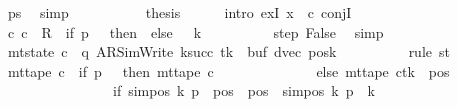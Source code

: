 \begin{isabellebody}
\ ps\ \isamarkupfalse%
\ simp\isanewline
\ \ \ \ \isamarkupfalse%
\isanewline
\ \ \ \ \isamarkupfalse%
\ {\isacharquery}{\kern0pt}thesis\isanewline
\ \ \ \ \isamarkupfalse%
\ {\isacharparenleft}{\kern0pt}intro\ exI{\isacharbrackleft}{\kern0pt}\ x\ {\isacharequal}{\kern0pt}\ c{\isacharprime}{\kern0pt}{\isacharprime}{\kern0pt}{\isacharbrackright}{\kern0pt}\ conjI{\isacharparenright}{\kern0pt}\isanewline
\ \ \ \ \ \ \isamarkupfalse%
\ {\isachardoublequoteopen}{\isacharparenleft}{\kern0pt}c{\isacharprime}{\kern0pt}{\isacharcomma}{\kern0pt}\ c{\isacharprime}{\kern0pt}{\isacharprime}{\kern0pt}{\isacharparenright}{\kern0pt}\ {\isasymin}\ {\isacharquery}{\kern0pt}R\ {\isacharcircum}{\kern0pt}{\isacharcircum}{\kern0pt}\ {\isacharparenleft}{\kern0pt}if\ p\ {\isacharequal}{\kern0pt}\ {}\ then\ {}\ else\ {}\ {\isacharasterisk}{\kern0pt}\ {\isacharquery}{\kern0pt}k{\isacharparenright}{\kern0pt}{\isachardoublequoteclose}\isanewline
\ \ \ \ \ \ \ \ \isamarkupfalse%
\ step\ False\ \isamarkupfalse%
\ simp\isanewline
\ \ \ \ \ \ \isamarkupfalse%
\ {\isachardoublequoteopen}mt{\isacharunderscore}{\kern0pt}state\ c{\isacharprime}{\kern0pt}{\isacharprime}{\kern0pt}\ {\isacharequal}{\kern0pt}\ {\isacharparenleft}{\kern0pt}q{\isacharcomma}{\kern0pt}\ AR{\isacharunderscore}{\kern0pt}SimWrite{\isacharcomma}{\kern0pt}\ k{\isacharunderscore}{\kern0pt}succ\ tk{\isacharcomma}{\kern0pt}\ {}{\isacharcomma}{\kern0pt}\ buf{\isacharcomma}{\kern0pt}\ dvec{\isacharcomma}{\kern0pt}\ posk{\isacharparenright}{\kern0pt}{\isachardoublequoteclose}\isanewline
\ \ \ \ \ \ \ \ \isamarkupfalse%
\ {\isacharparenleft}{\kern0pt}rule\ st{\isacharparenright}{\kern0pt}\isanewline
\ \ \ \ \ \ \isamarkupfalse%
\ {\isachardoublequoteopen}mt{\isacharunderscore}{\kern0pt}tape\ c{\isacharprime}{\kern0pt}{\isacharprime}{\kern0pt}\ {\isacharequal}{\kern0pt}\ {\isacharparenleft}{\kern0pt}if\ p\ {\isacharequal}{\kern0pt}\ {}\ then\ mt{\isacharunderscore}{\kern0pt}tape\ c{\isacharprime}{\kern0pt}\isanewline
\ \ \ \ \ \ \ \ \ \ \ \ \ \ else\ {\isacharparenleft}{\kern0pt}mt{\isacharunderscore}{\kern0pt}tape\ c{\isacharprime}{\kern0pt}{\isacharparenright}{\kern0pt}{\isacharparenleft}{\kern0pt}tk\ {\isacharcolon}{\kern0pt}{\isacharequal}{\kern0pt}\ {\isacharparenleft}{\kern0pt}{\isasymlambda}pos{\isachardot}{\kern0pt}\isanewline
\ \ \ \ \ \ \ \ \ \ \ \ \ \ \ \ if\ sim{\isacharunderscore}{\kern0pt}pos\ {\isacharquery}{\kern0pt}k\ p\ {\isasymle}\ pos\ {\isasymand}\ pos\ {\isacharless}{\kern0pt}\ sim{\isacharunderscore}{\kern0pt}pos\ {\isacharquery}{\kern0pt}k\ p\ {\isacharplus}{\kern0pt}\ {\isacharquery}{\kern0pt}k\isanewline

\end{isabellebody}
